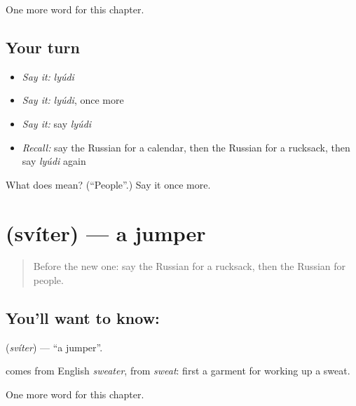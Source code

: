 \begin{grammarlens}[title={What you've built}]
One more word for this chapter.
\end{grammarlens}

\subsection*{Your turn}
\begin{itemize}
\raggedright
  \item \emph{Say it:} \emph{lyúdi}
  \item \emph{Say it:} \emph{lyúdi}, once more
  \item \emph{Say it:} say \emph{lyúdi}
  \item \emph{Recall:} say the Russian for a calendar, then the Russian for a rucksack, then say \emph{lyúdi} again
\end{itemize}

\begin{tcolorbox}[breakable,colback=teal!4,colframe=teal!35!black,title={Before you move on}]
What does  mean? (\textquotedblleft{}People\textquotedblright{}.) Say it once more.
\end{tcolorbox}
\section[\texorpdfstring{\ru{свитер} (svíter)}{свитер (svíter)}]{ (svíter) — a jumper}

\label{lesson:RU-C101-jumper}



\begin{quote}
Before the new one: say the Russian for a rucksack, then the Russian for people.
\end{quote}

\subsection*{You'll want to know: }
\textbf{} (\emph{svíter}) — \textquotedblleft{}a jumper\textquotedblright{}.

\begin{cousinweb}
\textbf{} comes from English \emph{sweater}, from \emph{sweat}: first a garment for working up a sweat.
\end{cousinweb}

\begin{grammarlens}[title={What you've built}]
One more word for this chapter.
\end{grammarlens}

